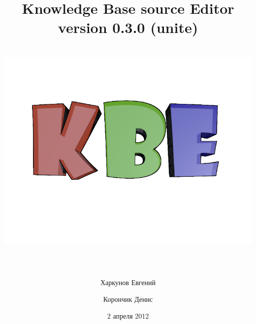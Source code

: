\title{
	\textcolor[rgb]{.67,.05,.05}{Knowledge} \textcolor[rgb]{.23,.62,.25}{Base} source \textcolor[rgb]{.11,.45,.86}{Editor} 					\\version 0.3.0 (unite)
	\includegraphics[width=16.30cm, height=12.22cm]{../images/title.png}
}
\author{Харкунов Евгений \and Корончик Денис}
\date{2 апреля 2012}
\maketitle

